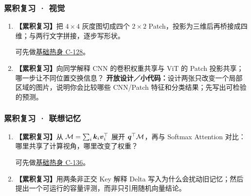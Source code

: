 \subsubsection*{累积复习 · 视觉}
\begin{enumerate}[label={},leftmargin=4.8em,itemsep=4pt]
\item[\textbf{R-15.}] \leavevmode{}\label{exercise:R-15}\label{exercise:review-image-token-shapes}\textbf{【累积复习】}把 $4\times4$ 灰度图切成四个 $2\times2$ Patch，投影为三维后再桥接成四维；与两行文字拼接，逐步写形状。\par 可先做\hyperref[exercise:rectangular-patch-count]{基础热身 C-128}。
\item[\textbf{R-16.}] \leavevmode{}\label{exercise:R-16}\label{exercise:review-vision-sharing}\textbf{【累积复习】}向同学解释 CNN 的卷积权重共享与 ViT 的 Patch 投影共享；哪一步让不同位置交换信息？
\textbf{开放设计／小代码：}设计两张只改变一个局部区域的图片，说明你会比较哪些 CNN/Patch 特征和分类结果；先写出可检验的预测。
\end{enumerate}
\subsubsection*{累积复习 · 联想记忆}
\begin{enumerate}[label={},leftmargin=4.8em,itemsep=4pt]
\item[\textbf{R-17.}] \leavevmode{}\label{exercise:R-17}\label{exercise:review-memory-pipeline}\textbf{【累积复习】}从 $\mathcal{M}=\sum_i \boldsymbol{k}_i \boldsymbol{v}_i^\top$ 展开 $\boldsymbol{q}^\top\mathcal{M}$，再与 Softmax Attention 对比：哪里共享了计算视角，哪里改变了权重？\par 可先做\hyperref[exercise:memory-relu-read]{基础热身 C-136}。
\item[\textbf{R-18.}] \leavevmode{}\label{exercise:R-18}\label{exercise:review-memory-correction}\textbf{【累积复习】}用两条非正交 Key 解释 Delta 写入为什么会扰动旧记忆；然后提出一个可运行的容量评测，而非只引用随机向量结论。
\end{enumerate}
